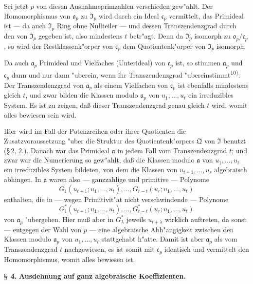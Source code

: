 Sei jetzt $p$ von diesen Ausnahmeprimzahlen verschieden gew"ahlt. Der Homomorphismus von $\mathfrak{o}_p$ zu $\mathfrak{I}_p$ wird durch ein Ideal $\mathfrak{c}_p$ vermittelt, das Primideal ist --- da auch $\mathfrak{I}_p$ Ring ohne Nullteiler --- und dessen Transzendenzgrad durch den von $\mathfrak{I}_p$ gegeben ist, also mindestens $t$ betr"agt. Denn da $\mathfrak{I}_p$ isomorph zu $\mathfrak{o}_p/\mathfrak{c}_p$, so wird der Restklassenk"orper von $\mathfrak{c}_p$ dem Quotientenk"orper von $\mathfrak{I}_p$ isomorph.

Da auch $\mathfrak{a}_p$ Primideal und Vielfaches (Unterideal) von $\mathfrak{c}_p$ ist, so stimmen $\mathfrak{a}_p$ und $\mathfrak{c}_p$ dann und nur dann "uberein, wenn ihr Transzendenzgrad "ubereinstimmt\textsuperscript{10)}. Der Transzendenzgrad von $\mathfrak{a}_p$ als einem Vielfachen von $\mathfrak{c}_p$ ist ebenfalls mindestens gleich $t$, und zwar bilden die Klassen modulo $\mathfrak{a}_p$ von $u_1,\ldots,u_t$ ein irreduzibles System. Es ist zu zeigen, da\ss{} dieser Transzendenzgrad genau gleich $t$ wird, womit alles bewiesen sein wird.

Hier wird im Fall der Potenzreihen oder ihrer Quotienten die Zusatzvoraussetzung "uber die Struktur des Quotientenk"orpers $\mathfrak{Q}$ von $\mathfrak{I}$ benutzt (\S\,2, 2.). Danach war das Primideal $\mathfrak{a}$ in jedem Fall vom Transzendenzgrad $t$; und zwar war die Numerierung so gew"ahlt, da\ss{} die Klassen modulo $\mathfrak{a}$ von $u_1,\ldots,u_t$ ein irreduzibles System bildeten, von dem die Klassen von $u_{t+1},\ldots,u_r$ algebraisch abhingen. In $\mathfrak{a}$ waren also --- ganzzahlige und primitive --- Polynome
\[
G_1(u_{t+1};u_1,\ldots,u_t),\ldots,G_{r-t}(u_r;u_1,\ldots,u_t)\tag{1}
\]
enthalten, die in --- wegen Primitivit"at nicht verschwindende --- Polynome
\[
G^*_1(u_{t+1};u_1,\ldots,u_t),\ldots,G^*_{r-t}(u_r;u_1,\ldots,u_t)\tag{2}
\]
von $\mathfrak{a}_p$ "ubergehen. Hier mu\ss{} aber in $G^*_\lambda$ jeweils $u_{t+\lambda}$ wirklich auftreten, da sonst --- entgegen der Wahl von $p$ --- eine algebraische Abh"angigkeit zwischen den Klassen modulo $\mathfrak{a}_p$ von $u_1,\ldots,u_t$ stattgehabt h"atte. Damit ist aber $\mathfrak{a}_p$ als vom Transzendenzgrad $t$ nachgewiesen, es ist somit mit $\mathfrak{c}_p$ identisch und vermittelt den Homomorphismus, womit alles bewiesen ist.

\bigskip
\S~\textbf{4.}
\textbf{Ausdehnung auf ganz algebraische Koeffizienten.}

